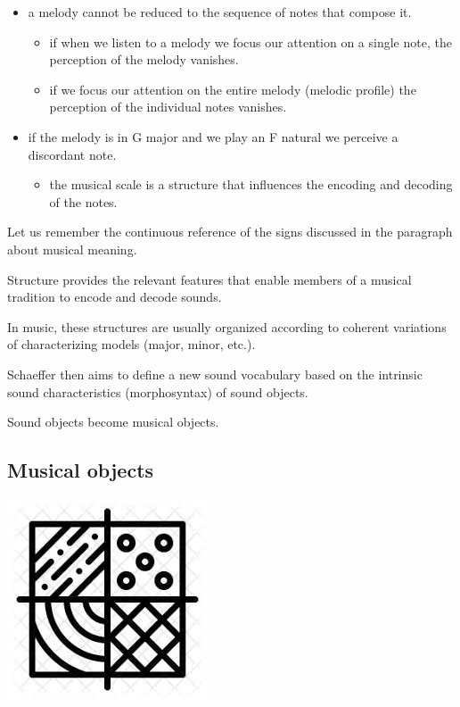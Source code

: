 \begin{itemize}
\tightlist
\item a melody cannot be reduced to the sequence of notes that compose it.
  \begin{itemize}
  \tightlist
  \item if when we listen to a melody we focus our attention on a single note, the perception of the melody vanishes.
  \item if we focus our attention on the entire melody (melodic profile) the perception of the individual notes vanishes.
  \end{itemize}
\item if the melody is in G major and we play an F natural we perceive a discordant note.

  \begin{itemize}
  \tightlist
  \item the musical scale is a structure that influences the encoding and decoding of the notes.
  \end{itemize}
\end{itemize}

Let us remember the continuous reference of the signs discussed in the paragraph about musical meaning.

Structure provides the relevant features that enable members of a musical tradition to encode and decode sounds.

In music, these structures are usually organized according to coherent variations of characterizing models (major, minor, etc.).

Schaeffer then aims to define a new sound vocabulary based on the intrinsic sound characteristics (morphosyntax) of sound objects.

Sound objects become musical objects.

\subsection{Musical objects}\label{musical-objects}

\begin{center}
\includegraphics[scale=0.2]{../img/texture1.png}
\end{center}

